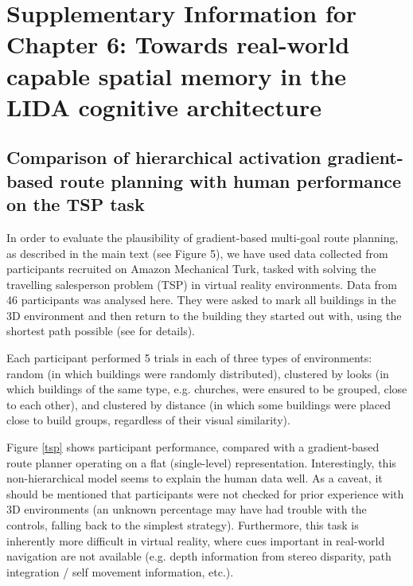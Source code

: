 
\chapter{Supplementary Information for Chapter 6: Towards real-world capable spatial memory in the LIDA cognitive architecture}
\label{apx:lidaspm}
\section{Comparison of hierarchical activation gradient-based route planning with human performance on the TSP task}


In order to evaluate the plausibility of gradient-based multi-goal route planning, as described in the main text (see Figure 5), we have used data collected from participants recruited on Amazon Mechanical Turk, tasked with solving the travelling salesperson problem (TSP) in virtual reality environments. Data from 46 participants was analysed here. They were asked to mark all buildings in the 3D environment and then return to the building they started out with, using the shortest path possible (see \citep{madl2013spatial} for details). 

Each participant performed 5 trials in each of three types of environments: random (in which buildings were randomly distributed), clustered by looks (in which buildings of the same type, e.g. churches, were ensured to be grouped, close to each other), and clustered by distance (in which some buildings were placed close to build groups, regardless of their visual similarity).

Figure \ref{tsp} shows participant performance, compared with a gradient-based route planner operating on a flat (single-level) representation. Interestingly, this non-hierarchical model seems to explain the human data well. As a caveat, it should be mentioned that participants were not checked for prior experience with 3D environments (an unknown percentage may have had trouble with the controls, falling back to the simplest strategy). Furthermore, this task is inherently more difficult in virtual reality, where cues important in real-world navigation are not available (e.g. depth information from stereo disparity, path integration / self movement information, etc.).

